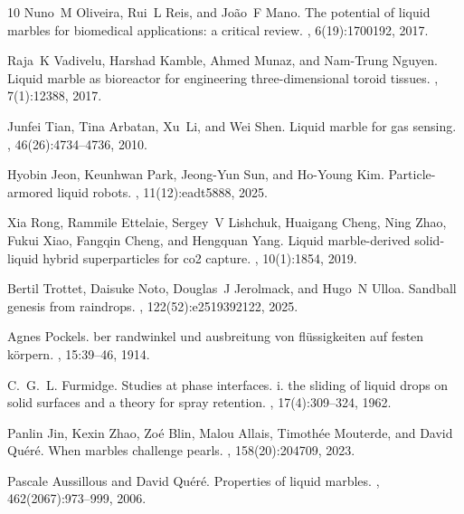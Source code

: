 \documentclass[twocolumn, prl,
 amsmath,amssymb,
 superscriptaddress,aps,
]{revtex4-2}
\begin{document}
\begin{thebibliography}{10}
	Nuno~M Oliveira, Rui~L Reis, and Jo{\~a}o~F Mano.
	\newblock The potential of liquid marbles for biomedical applications: a
	critical review.
	, 6(19):1700192, 2017.

	Raja~K Vadivelu, Harshad Kamble, Ahmed Munaz, and Nam-Trung Nguyen.
	\newblock Liquid marble as bioreactor for engineering three-dimensional toroid
	tissues.
	, 7(1):12388, 2017.

	Junfei Tian, Tina Arbatan, Xu~Li, and Wei Shen.
	\newblock Liquid marble for gas sensing.
	, 46(26):4734--4736, 2010.

	Hyobin Jeon, Keunhwan Park, Jeong-Yun Sun, and Ho-Young Kim.
	\newblock Particle-armored liquid robots.
	, 11(12):eadt5888, 2025.

	Xia Rong, Rammile Ettelaie, Sergey~V Lishchuk, Huaigang Cheng, Ning Zhao, Fukui
	Xiao, Fangqin Cheng, and Hengquan Yang.
	\newblock Liquid marble-derived solid-liquid hybrid superparticles for co2
	capture.
	, 10(1):1854, 2019.

	Bertil Trottet, Daisuke Noto, Douglas~J Jerolmack, and Hugo~N Ulloa.
	\newblock Sandball genesis from raindrops.
	,
	122(52):e2519392122, 2025.

	Agnes Pockels.
	ber randwinkel und ausbreitung von fl{\"u}ssigkeiten auf festen
	k{\"o}rpern.
	, 15:39--46, 1914.

	C.~G.~L. Furmidge.
	\newblock Studies at phase interfaces. i. the sliding of liquid drops on solid
	surfaces and a theory for spray retention.
	, 17(4):309--324, 1962.

	Panlin Jin, Kexin Zhao, Zo{\'e} Blin, Malou Allais, Timoth{\'e}e Mouterde, and
	David Qu{\'e}r{\'e}.
	\newblock When marbles challenge pearls.
	, 158(20):204709, 2023.

	Pascale Aussillous and David Qu{\'e}r{\'e}.
	\newblock Properties of liquid marbles.
	, 462(2067):973--999, 2006.


\end{thebibliography}
\end{document}
